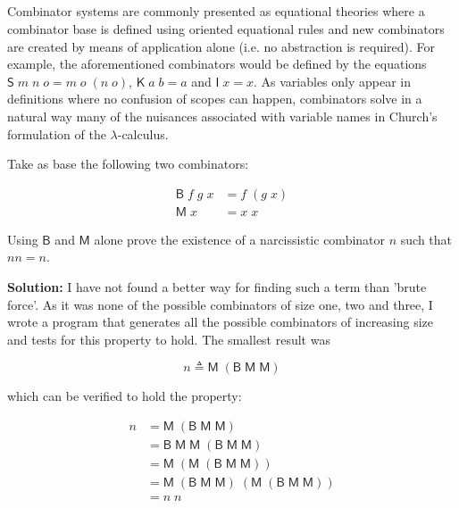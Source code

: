 \documentclass{article}
\begin{document}
\subsection{}\label{ex:5}

Combinator systems are commonly presented as equational 
theories where a combinator base is defined using oriented 
equational rules and new combinators are created by means 
of application alone (i.e. no abstraction is required). For 
example, the aforementioned combinators would be defined by 
the equations $\mathsf{S}\;m\;n\;o = m\;o\;(n\;o)$, 
$\mathsf{K}\;a\;b = a$ and $\mathsf{I}\;x = x$. As variables 
only appear in definitions where no confusion of scopes can 
happen, combinators solve in a natural way many of the nuisances
associated with variable names in Church’s formulation of the 
$\lambda$-calculus.

Take as base the following two combinators: 

\begin{align*}
  \mathsf{B}\;f\;g\;x &= f\;(g\;x) \\ 
  \mathsf{M}\;x &= x\;x 
\end{align*}

Using $\mathsf{B}$ and $\mathsf{M}$ alone prove the existence of 
a narcissistic combinator $n$ such that $nn = n$.

\textbf{Solution:} I have not found a better way for finding such 
a term than 'brute force'. As it was none of the possible 
combinators of size one, two and three, I wrote a program that 
generates all the possible combinators of increasing size and tests 
for this property to hold. The smallest result was

$$
  n \triangleq \mathsf{M}\;
    (\mathsf{B}\;\mathsf{M}\;\mathsf{M})
$$

which can be verified to hold the property:

\begin{align*}
  n &= \mathsf{M}\;(\mathsf{B}\;\mathsf{M}\;\mathsf{M}) \\
    &= \mathsf{B}\;\mathsf{M}\;\mathsf{M}\;
      (\mathsf{B}\;\mathsf{M}\;\mathsf{M}) \\
    &= \mathsf{M}\;(\mathsf{M}\;
      (\mathsf{B}\;\mathsf{M}\;\mathsf{M})) \\
    &= \mathsf{M}\;
      (\mathsf{B}\;\mathsf{M}\;\mathsf{M})\;
      (\mathsf{M}\;(\mathsf{B}\;\mathsf{M}\;\mathsf{M})) \\
    &= n\;n
\end{align*}
\end{document}
